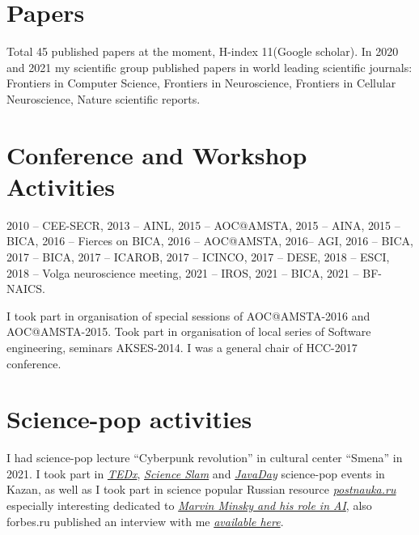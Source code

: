 \documentclass{moderncv}
\begin{document}
\section{Papers}
Total 45 published papers at the moment, H-index 11(Google scholar).
In 2020 and 2021 my scientific group published papers in world leading scientific journals:
Frontiers in Computer Science, Frontiers in Neuroscience, Frontiers in Cellular Neuroscience, Nature scientific reports.

 

\cvitem{}{}

\section{Conference and Workshop Activities}

2010 -- CEE-SECR, 2013 -- AINL, 2015 -- AOC@AMSTA, 2015 -- AINA, 2015 -- BICA, 2016 -- Fierces on BICA, 2016 -- AOC@AMSTA, 2016-- AGI, 2016 -- BICA, 2017 -- BICA, 2017 -- ICAROB, 2017 -- ICINCO, 2017 -- DESE, 2018 -- ESCI, 2018 -- Volga neuroscience meeting, 2021 -- IROS, 2021 -- BICA, 2021 -- BF-NAICS. 

I took part in organisation of special sessions of AOC@AMSTA-2016 and AOC@AMSTA-2015. Took part in organisation of local series of Software engineering, seminars AKSES-2014. I was a general chair of HCC-2017 conference.

\section{Science-pop activities}
I had science-pop lecture ``Cyberpunk revolution'' in cultural center ``Smena'' in 2021.
I took part in \href{https://www.youtube.com/watch?v=BLvS7h3kRbo}{\emph{TEDx}}, \href{https://vk.com/video-87488544_171504962}{\emph{Science Slam}} and \href{https://www.youtube.com/watch?v=sLLKxvUEA7E}{\emph{JavaDay}} science-pop events in Kazan, as well as I took part in science popular Russian resource \href{https://postnauka.ru/author/talanov}{\emph{postnauka.ru}} especially interesting dedicated to \href{https://postnauka.ru/faq/58727}{\emph{Marvin Minsky and his role in AI}}, also forbes.ru published an interview with me \href{http://www.forbes.ru/mneniya-column/288097-kak-sozdat-emotsionalnyi-iskusstvennyi-intellekt}{\emph{available here}}.
\end{document}
